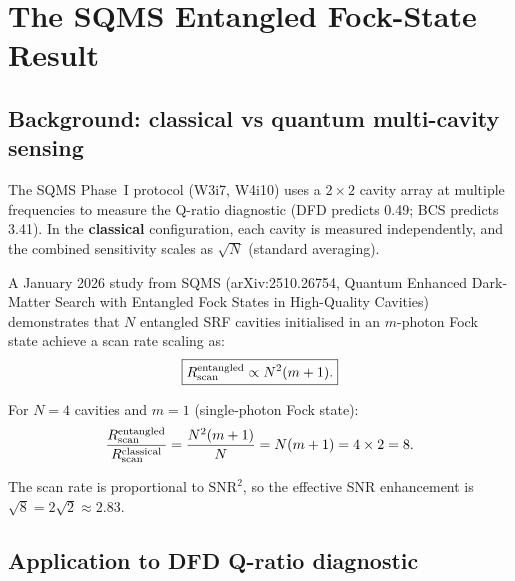 \documentclass[11pt]{article}
\theoremstyle{definition}
\theoremstyle{remark}
\begin{document}
\section{The SQMS Entangled Fock-State Result}
\label{sec:fock}

\subsection{Background: classical vs quantum multi-cavity sensing}

The SQMS Phase~I protocol (W3i7, W4i10) uses a $2\times 2$ cavity array
at multiple frequencies to measure the Q-ratio diagnostic (DFD predicts
0.49; BCS predicts 3.41). In the \textbf{classical} configuration, each
cavity is measured independently, and the combined sensitivity scales as
$\sqrt{N}$ (standard averaging).

A January 2026 study from SQMS (arXiv:2510.26754, Quantum Enhanced
Dark-Matter Search with Entangled Fock States in High-Quality
Cavities) demonstrates that $N$ entangled SRF cavities initialised in
an $m$-photon Fock state achieve a scan rate scaling as:
\begin{equation}
\boxed{
R_{\rm scan}^{\rm entangled} \propto N^2(m+1).
}
\label{eq:fock_scaling}
\end{equation}

For $N = 4$ cavities and $m = 1$ (single-photon Fock state):
\begin{equation}
\frac{R_{\rm scan}^{\rm entangled}}{R_{\rm scan}^{\rm classical}}
= \frac{N^2(m+1)}{N} = N(m+1) = 4\times 2 = 8.
\label{eq:enhancement}
\end{equation}

The scan rate is proportional to $\mathrm{SNR}^2$, so the effective
SNR enhancement is $\sqrt{8} = 2\sqrt{2} \approx 2.83$.

\subsection{Application to DFD Q-ratio diagnostic}
\end{document}
